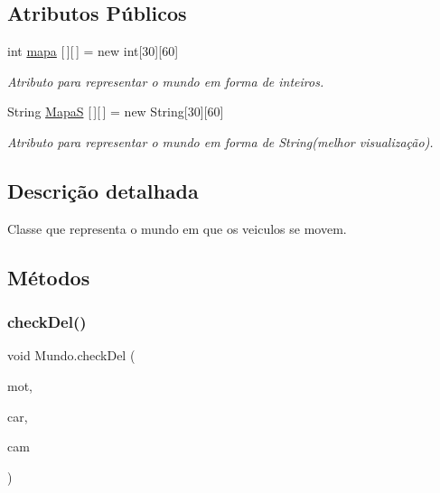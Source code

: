 \subsection*{Atributos Públicos}
\begin{DoxyCompactItemize}
\item 
int \mbox{\hyperlink{class_mundo_a8332b2d52b9f317338a4d6cbe10bbcbb}{mapa}} \mbox{[}$\,$\mbox{]}\mbox{[}$\,$\mbox{]} = new int\mbox{[}30\mbox{]}\mbox{[}60\mbox{]}
\begin{DoxyCompactList}\small\item\em Atributo para representar o mundo em forma de inteiros. \end{DoxyCompactList}\item 
String \mbox{\hyperlink{class_mundo_ac3b4e49cf251690a1ad421b3e8458ec6}{MapaS}} \mbox{[}$\,$\mbox{]}\mbox{[}$\,$\mbox{]} = new String\mbox{[}30\mbox{]}\mbox{[}60\mbox{]}
\begin{DoxyCompactList}\small\item\em Atributo para representar o mundo em forma de String(melhor visualização). \end{DoxyCompactList}\end{DoxyCompactItemize}


\subsection{Descrição detalhada}
Classe que representa o mundo em que os veiculos se movem. 

\subsection{Métodos}
\mbox{\label{class_mundo_a0317827fd7dc86705d5ad3fb86d61741}} 
\subsubsection{\texorpdfstring{check\+Del()}{checkDel()}}
{\footnotesize\ttfamily void Mundo.\+check\+Del (\begin{DoxyParamCaption}\item[{Array\+List$<$ \mbox{\hyperlink{class_moto}{Moto}} $>$}]{mot,  }\item[{Array\+List$<$ \mbox{\hyperlink{class_carro}{Carro}} $>$}]{car,  }\item[{Array\+List$<$ \mbox{\hyperlink{class_caminhao}{Caminhao}} $>$}]{cam }\end{DoxyParamCaption})}

